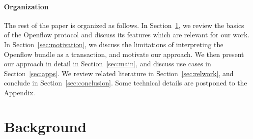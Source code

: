 \documentclass[conference]{sigcomm-alternate}
\begin{document}

\paragraph{Organization}
The rest of the paper is organized as follows.
In Section~\ref{sec:background}, we review the basics of the  Openflow
protocol and discuss its features which are relevant for our work.
In Section~\ref{sec:motivation}, we discuss the limitations of interpreting
the Openflow bundle as a transaction, and motivate our approach.
We then present our approach in detail in Section~\ref{sec:main}, and discuss use cases in Section~\ref{sec:apps}.
We review related literature in Section~\ref{sec:relwork}, and conclude
in Section~\ref{sec:conclusion}. Some technical details are postponed
to the Appendix.


\section{Background}\label{sec:background}
\end{document}
